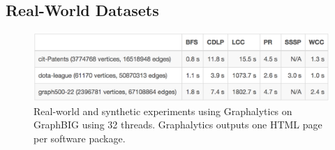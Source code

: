 \documentclass[conference]{IEEEtran}
\begin{document}
\subsection{Real-World Datasets}
\begin{figure}
	\includegraphics[width=\linewidth, trim=0 18pt 6pt 0pt, clip]{graphics/graphalytics-GraphBIG.png}
	\caption{Real-world and synthetic experiments using Graphalytics on GraphBIG using 32 threads. Graphalytics outputs one HTML page per software package.}
	\label{fig:graphalytics-html}
\end{figure}
\end{document}
